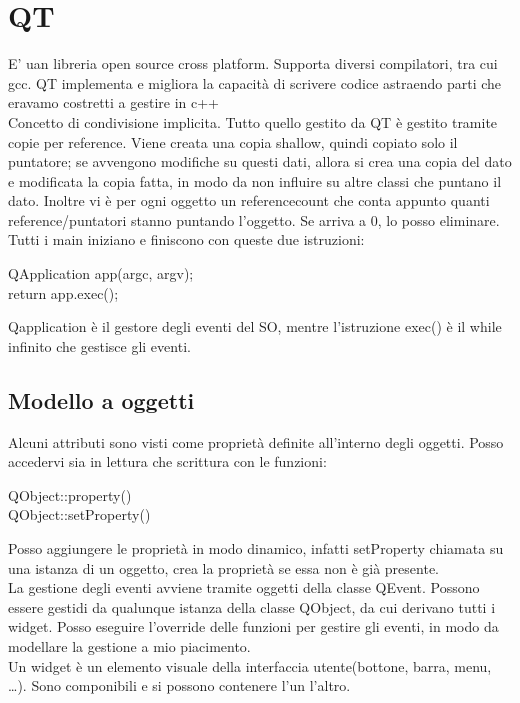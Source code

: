 \chapter{QT}
E' uan libreria open source cross platform. Supporta diversi compilatori, tra cui gcc. QT implementa e migliora la capacità di scrivere codice astraendo parti che eravamo costretti a gestire in c++\\
Concetto di condivisione implicita. Tutto quello gestito da QT è gestito tramite copie per reference. Viene creata una copia shallow, quindi copiato solo il puntatore; se avvengono modifiche su questi dati, allora si crea una copia del dato e modificata la copia fatta, in modo da non influire su altre classi che puntano il dato. Inoltre vi è per ogni oggetto un referencecount che conta appunto quanti reference/puntatori stanno puntando l'oggetto. Se arriva a 0, lo posso eliminare.\\
Tutti i main iniziano e finiscono con queste due istruzioni:

\begin{tcolorbox}
QApplication app(argc, argv);\\
return app.exec();
\end{tcolorbox}

Qapplication è il gestore degli eventi del SO, mentre l'istruzione exec() è il while infinito che gestisce gli eventi.

\section{Modello a oggetti}
Alcuni attributi sono visti come proprietà definite all'interno degli oggetti. Posso accedervi sia in lettura che scrittura con le funzioni:\\

\begin{tcolorbox}
QObject::property()\\
QObject::setProperty()
\end{tcolorbox}

Posso aggiungere le proprietà in modo dinamico, infatti setProperty chiamata su una istanza di un oggetto, crea la proprietà se essa non è già presente.\\

La gestione degli eventi avviene tramite oggetti della classe QEvent. Possono essere gestidi da qualunque istanza della classe QObject, da cui derivano tutti i widget. Posso eseguire l'override delle funzioni per gestire gli eventi, in modo da modellare la gestione a mio piacimento.\\
Un widget è un elemento visuale della interfaccia utente(bottone, barra, menu, \dots). Sono componibili e si possono contenere l'un l'altro.

